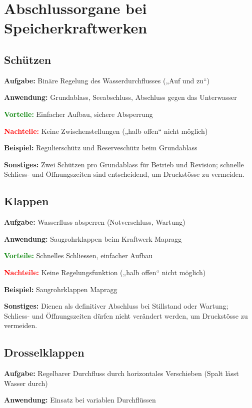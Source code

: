 \newpage
\section{Abschlussorgane bei Speicherkraftwerken}

\subsection{Schützen}
\textbf{Aufgabe:}  
Binäre Regelung des Wasserdurchflusses („Auf und zu“)

\textbf{Anwendung:}  
Grundablass, Seeabschluss, Abschluss gegen das Unterwasser

\textbf{\textcolor{green}{Vorteile:}}  
Einfacher Aufbau, sichere Absperrung

\textbf{\textcolor{red}{Nachteile:}}  
Keine Zwischenstellungen („halb offen“ nicht möglich)

\textbf{Beispiel:}  
Regulierschütz und Reserveschütz beim Grundablass

\textbf{Sonstiges:}  
Zwei Schützen pro Grundablass für Betrieb und Revision; schnelle Schliess- und Öffnungszeiten sind entscheidend, um Druckstösse zu vermeiden.

\subsection{Klappen}
\textbf{Aufgabe:}  
Wasserfluss absperren (Notverschluss, Wartung)

\textbf{Anwendung:}  
Saugrohrklappen beim Kraftwerk Mapragg

\textbf{\textcolor{green}{Vorteile:}}  
Schnelles Schliessen, einfacher Aufbau

\textbf{\textcolor{red}{Nachteile:}}  
Keine Regelungsfunktion („halb offen“ nicht möglich)

\textbf{Beispiel:}  
Saugrohrklappen Mapragg

\textbf{Sonstiges:}  
Dienen als definitiver Abschluss bei Stillstand oder Wartung; Schliess- und Öffnungszeiten dürfen nicht verändert werden, um Druckstösse zu vermeiden.

\subsection{Drosselklappen}
\textbf{Aufgabe:}  
Regelbarer Durchfluss durch horizontales Verschieben (Spalt lässt Wasser durch)

\textbf{Anwendung:}  
Einsatz bei variablen Durchflüssen


